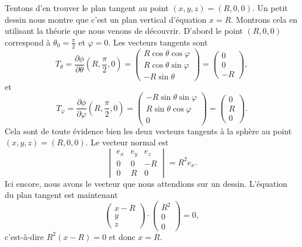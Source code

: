 \begin{example}
	Tentons d'en trouver le plan tangent au point $(x,y,z)=(R,0,0)$. Un petit dessin nous montre que c'est un plan vertical d'équation $x=R$. Montrons cela en utilisant la théorie que nous venons de découvrir. D'abord le point $(R,0,0)$ correspond à $\theta_0=\frac{ \pi }{ 2 }$ et $\varphi=0$. Les vecteurs tangents sont
	\begin{equation}        \label{EqTthetaSph}
		T_{\theta}=\frac{ \partial \phi }{ \partial \theta }(R,\frac{ \pi }{2},0)=\begin{pmatrix}
			R\cos\theta\cos\varphi \\
			R\cos\theta\sin\varphi \\
			-R\sin\theta
		\end{pmatrix}=\begin{pmatrix}
			0 \\
			0 \\
			-R
		\end{pmatrix},
	\end{equation}
	et
	\begin{equation}    \label{EqTvarphiSph}
		T_{\varphi}=\frac{ \partial \phi }{ \partial \varphi }(R,\frac{ \pi }{2},0)=\begin{pmatrix}
			-R\sin\theta\sin\varphi \\
			R\sin\theta\cos\varphi  \\
			0
		\end{pmatrix}=\begin{pmatrix}
			0 \\
			R \\
			0
		\end{pmatrix}.
	\end{equation}
	Cela sont de toute évidence bien les deux vecteurs tangents à la sphère au point $(x,y,z)=(R,0,0)$. Le vecteur normal est
	\begin{equation}
		\begin{vmatrix}
			e_x & e_y & e_z \\
			0   & 0   & -R  \\
			0   & R   & 0
		\end{vmatrix}=R^2e_x.
	\end{equation}
	Ici encore, nous avons le vecteur que nous attendions sur un dessin. L'équation du plan tangent est maintenant
	\begin{equation}
		\begin{pmatrix}
			x-R \\
			y   \\
			z
		\end{pmatrix}\cdot
		\begin{pmatrix}
			R^2 \\
			0   \\
			0
		\end{pmatrix}=0,
	\end{equation}
	c'est-à-dire $R^2(x-R)=0$ et donc $x=R$.
\end{example}

